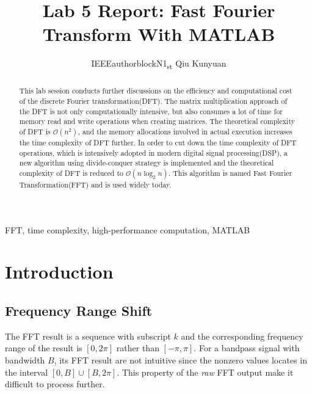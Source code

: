 \documentclass[conference]{IEEEtran}
\begin{document}
\title{Lab 5 Report: Fast Fourier Transform With MATLAB}

\author{IEEEauthorblockN{1\textsubscript{st} Qiu Kunyuan}
}
\maketitle

\begin{abstract}
	This lab session conducts further discussions on the efficiency and computational cost of the discrete Fourier transformation(DFT). The matrix multiplication approach of the DFT is not only computationally intensive, but also consumes a lot of time for memory read and write operations when creating matrices. The theoretical complexity of DFT is \( \mathcal{O} (n^{2}) \), and the memory allocations involved in actual execution increases the time complexity of DFT further. In order to cut down the time complexity of DFT operations, which is intensively adopted in modern digital signal processing(DSP), a new algorithm using divide-conquer strategy is implemented and the theoretical complexity of DFT is reduced to \( \mathcal{O} (n\log_{2}n) \). This algorithm is named Fast Fourier Transformation(FFT) and is used widely today.
\end{abstract}

\begin{IEEEkeywords}
	FFT, time complexity, high-performance computation, MATLAB
\end{IEEEkeywords}

\section{Introduction}

\subsection{Frequency Range Shift}
The FFT result is a sequence with subscript \( k \) and the corresponding frequency range of the result is \( [0,2\pi ] \) rather than \( [-\pi ,\pi ] \). For a bandpass signal with bandwidth \( B \), its FFT result are not intuitive since the nonzero values locates in the interval \( [0,B] \cup [B,2\pi ]\). This property of the \textit{raw} FFT output make it difficult to process further.
\end{document}
